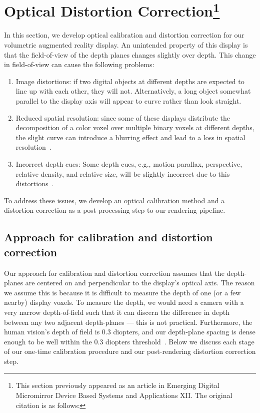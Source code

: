 \section[Optical Distortion Correction]{Optical Distortion Correction\footnote{This section previously appeared as an article in Emerging Digital Micromirror Device Based Systems and Applications XII. The original citation is as follows: }}
\label{sec:volumetric:distortion_correction}
In this section, we develop optical calibration and distortion correction for our volumetric augmented reality display. An unintended property of this display is that the field-of-view of the depth planes changes slightly over depth. This change in field-of-view can cause the following problems:

\begin{enumerate}
    \item Image distortions: if two digital objects at different depths are expected to line up with each other, they will not. Alternatively, a long object somewhat parallel to the display axis will appear to curve rather than look straight.
    \item Reduced spatial resolution: since some of these displays distribute the decomposition of a color voxel over multiple binary voxels at different depths, the slight curve can introduce a blurring effect and lead to a loss in spatial resolution~\cite{Rathinavel2018}. 
    \item Incorrect depth cues: Some depth cues, e.g., motion parallax, perspective, relative density, and relative size, will be slightly incorrect due to this distortions~\cite{cutting1995perceiving}.
\end{enumerate}

To address these issues, we develop an optical calibration method and a distortion correction as a post-processing step to our rendering pipeline. 

\subsection{Approach for calibration and distortion correction}

Our approach for calibration and distortion correction assumes that the depth-planes are centered on and perpendicular to the display's optical axis. 
The reason we assume this is because it is difficult to measure the depth of one (or a few nearby) display voxels. 
To measure the depth, we would need a camera with a very narrow depth-of-field such that it can discern the difference in depth between any two adjacent depth-planes --- this is not practical. 
Furthermore, the human vision's depth of field is 0.3 diopters, and our depth-plane spacing is dense enough to be well within the 0.3 diopters threshold~\cite{Rathinavel2018}. 
Below we discuss each stage of our one-time calibration procedure and our post-rendering distortion correction step.

